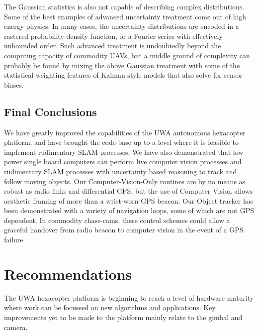 \documentclass{article}
\begin{document}
    The Gaussian statistics is also not capable of describing complex distributions.  Some of the best examples of advanced uncertainty treatment come out of high energy physics.  In many cases, the uncertainty distributions are encoded in a rastered probability density function, or a Fourier series with effectively unbounded order.  Such advanced treatment is undoubtedly beyond the computing capacity of commodity UAVs, but a middle ground of complexity can probably be found by mixing the above Gaussian treatment with some of the statistical weighting features of Kalman style models that also solve for sensor biases.


  \subsection{Final Conclusions}


  We have greatly improved the capabilities of the UWA autonomous hexacopter platform, and have brought the code-base up to a level where it is feasible to implement rudimentary SLAM processes.
  We have also demonstrated that low-power single board computers can perform live computer vision processes and rudimentary SLAM processes with uncertainty based reasoning to track and follow moving objects.
  Our Computer-Vision-Only routines are by no means as robust as radio links and differential GPS, but the use of Computer Vision allows aesthetic framing of more than a wrist-worn GPS beacon.
  Our Object tracker has been demonstrated with a variety of navigation loops, some of which are not GPS dependent.  In commodity chase-cams, these control schemes could allow a graceful handover from radio beacon to computer vision in the event of a GPS failure.



\section{Recommendations}

  The UWA hexacopter platform is beginning to reach a level of hardware maturity where work can be focussed on new algorithms and applications.  Key improvements yet to be made to the platform mainly relate to the gimbal and camera.
\end{document}
